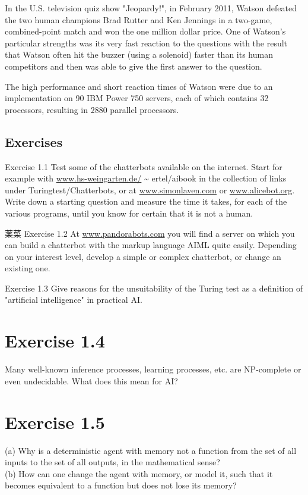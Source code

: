 \documentclass[10pt]{book}
\begin{document}
In the U.S. television quiz show "Jeopardy!", in February 2011, Watson defeated the two human champions Brad Rutter and Ken Jennings in a two-game, combined-point match and won the one million dollar price. One of Watson's particular strengths was its very fast reaction to the questions with the result that Watson often hit the buzzer (using a solenoid) faster than its human competitors and then was able to give the first answer to the question.

The high performance and short reaction times of Watson were due to an implementation on 90 IBM Power 750 servers, each of which contains 32 processors, resulting in 2880 parallel processors.

\subsection{Exercises}
Exercise 1.1 Test some of the chatterbots available on the internet. Start for example with \href{http://www.hs-weingarten.de/}{www.hs-weingarten.de/} \~{} ertel/aibook in the collection of links under Turingtest/Chatterbots, or at \href{http://www.simonlaven.com}{www.simonlaven.com} or \href{http://www.alicebot.org}{www.alicebot.org}. Write down a starting question and measure the time it takes, for each of the various programs, until you know for certain that it is not a human.

薬菜 Exercise 1.2 At \href{http://www.pandorabots.com}{www.pandorabots.com} you will find a server on which you can build a chatterbot with the markup language AIML quite easily. Depending on your interest level, develop a simple or complex chatterbot, or change an existing one.

Exercise 1.3 Give reasons for the unsuitability of the Turing test as a definition of "artificial intelligence" in practical AI.\\
\section{Exercise 1.4}
Many well-known inference processes, learning processes, etc. are NP-complete or even undecidable. What does this mean for AI?

\section{Exercise 1.5}
(a) Why is a deterministic agent with memory not a function from the set of all inputs to the set of all outputs, in the mathematical sense?\\
(b) How can one change the agent with memory, or model it, such that it becomes equivalent to a function but does not lose its memory?\\
\end{document}
